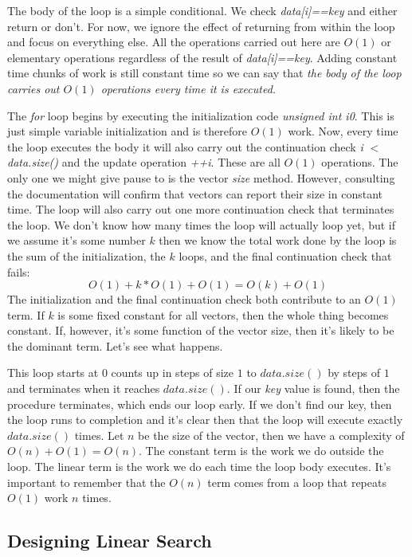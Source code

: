 \documentclass[]{tufte-handout}
\begin{document}
The body of the loop is a simple conditional. We check \textit{data[i]==key} and either return or don't.  For now, we ignore the effect of returning from within the loop and focus on everything else.  All the operations carried out here are $O(1)$ or elementary operations regardless of the result of \textit{data[i]==key}. Adding constant time chunks of work is still constant time so we can say that \textit{the body of the loop carries out $O(1)$ operations every time it is executed.}

The \textit{for} loop begins by executing the initialization code \textit{unsigned int i{0}}. This is just simple variable initialization and is therefore $O(1)$ work. Now, every time the loop executes the body it will also carry out the continuation check \textit{i $<$ data.size()} and the update operation \textit{++i}. These are all $O(1)$ operations.  The only one we might give pause to is the vector \textit{size} method.  However, consulting the documentation will confirm that vectors can report their size in constant time. The loop will also carry out one more continuation check that terminates the loop. We don't know how many times the loop will actually loop yet, but if we assume it's some number $k$ then we know the total work done by the loop is the sum of the initialization, the $k$ loops, and the final continuation check that fails:
\[
O(1)+k*O(1)+O(1) = O(k) + O(1)
\]
The initialization and the final continuation check both contribute to an $O(1)$ term. If $k$ is some fixed constant for all vectors, then the whole thing becomes constant. If, however, it's some function of the vector size, then it's likely to be the dominant term. Let's see what happens.

This loop starts at $0$ counts up in steps of size $1$ to $data.size()$ by steps of $1$ and terminates when it reaches $data.size()$. If our \textit{key} value is found, then the procedure terminates, which ends our loop early. If we don't find our key, then the loop runs to completion and it's clear then that the loop will execute exactly $data.size()$ times. Let $n$ be the size of the vector, then we have a complexity of $O(n)+O(1)=O(n)$. The constant term is the work we do outside the loop. The linear term is the work we do each time the loop body executes.  It's important to remember that the $O(n)$ term comes from a loop that repeats $O(1)$ work $n$ times. 

\subsection{Designing Linear Search}
\end{document}
